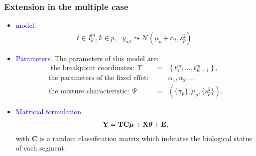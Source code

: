 \documentclass[compress]{beamer}
\newcommand{\mubf}{\text{\mathversion{bold}{$\mu$}}}
\newcommand{\thetabf}{\text{\mathversion{bold}{$\theta$}}}
\newcommand{\Ybf}{\textbf{Y}}
\newcommand{\Xbf}{\textbf{X}}
\newcommand{\Ebf}{\textbf{E}}
\newcommand{\Tbf}{\textbf{T}}
\newcommand{\Cbf}{\textbf{C}}
\begin{document}
\begin{frame}
\frametitle{Extension in the multiple case}
\begin{itemize}
\item<1-> \textcolor{blue}{model.}
\begin{eqnarray*}
t\in I_{k}^m, k\in p, \ \ \ y_{mt} \leadsto \mathcal{N}(\mu_p+\alpha_t, s_p^2).
\end{eqnarray*}
\item<2-> \textcolor{blue}{Parameters.}
The parameters of this model are:
\begin{eqnarray*}
\mbox{ the breakpoint coordinates:} \ \ T  &= &\left\{t_1^m,\ldots,t_{K-1}^m\right\},\\
 \mbox{the parameters of the fixed effet:} \ \ & & \alpha_1,\alpha_2,\ldots\\ 
\mbox{the mixture characteristic:}\ \  \Psi &= &(\{\pi_p\},{\mu_p}, \{s_p^2\}). 
\end{eqnarray*}
\item<3-> \textcolor{blue}{Matricial formulation} 
\begin{eqnarray*}
\Ybf = \Tbf \Cbf\mubf + \Xbf \thetabf  + \Ebf,
\end{eqnarray*}
with $\Cbf$ is a random classification matrix which indicates the biological status of each segment.
\end{itemize}
\end{frame}
\end{document}
